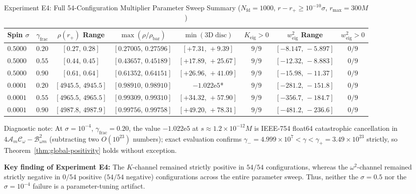 \documentclass[11pt, a4paper]{article}
\theoremstyle{remark}
\begin{document}
\begin{table}[h]
\centering
\caption{Experiment E4: Full 54-Configuration Multiplier Parameter Sweep Summary ($N_{\mathrm{fd}} = 1000$, $r - r_+ \ge 10^{-10}\sigma$, $r_{\max} = 300M$)}
\label{tab:sweep-summary}
\small
\begin{tabular}{@{}lccccccc@{}}
\toprule
Spin $\sigma$ & $\gamma_{\mathrm{frac}}$ & $\rho(r_+)$ Range & $\max(\rho/\rho_{\mathrm{bar}})$ & $\min(\mathrm{3D\;disc})$ & $K_{\mathrm{eig}} > 0$ & $w^2_{\mathrm{eig}}$ Range & $w^2_{\mathrm{eig}} > 0$ \\
\midrule
$0.5000$ & $0.20$ & $[0.27,\, 0.28]$ & $[0.27005,\, 0.27596]$ & $[+7.31,\, +9.39]$ & $9/9$ & $[-8.147,\, -5.897]$ & $0/9$ \\
$0.5000$ & $0.55$ & $[0.44,\, 0.45]$ & $[0.43657,\, 0.45189]$ & $[+17.89,\, +25.67]$ & $9/9$ & $[-12.32,\, -8.883]$ & $0/9$ \\
$0.5000$ & $0.90$ & $[0.61,\, 0.64]$ & $[0.61352,\, 0.64151]$ & $[+26.96,\, +41.09]$ & $9/9$ & $[-15.98,\, -11.37]$ & $0/9$ \\
\midrule
$0.0001$ & $0.20$ & $[4945.5,\, 4945.5]$ & $[0.98910,\, 0.98910]$ & $-1.022\mathrm{e}{5}$* & $9/9$ & $[-281.2,\, -151.8]$ & $0/9$ \\
$0.0001$ & $0.55$ & $[4965.5,\, 4965.5]$ & $[0.99309,\, 0.99310]$ & $[+34.32,\, +57.90]$ & $9/9$ & $[-356.7,\, -184.7]$ & $0/9$ \\
$0.0001$ & $0.90$ & $[4987.8,\, 4987.9]$ & $[0.99756,\, 0.99758]$ & $[+49.20,\, +78.31]$ & $9/9$ & $[-481.2,\, -236.6]$ & $0/9$ \\
\bottomrule
\end{tabular}
\begin{flushleft}
\footnotesize *Diagnostic note: At $\sigma = 10^{-4}$, $\gamma_{\mathrm{frac}} = 0.20$, the value $-1.022\mathrm{e}{5}$ at $s \approx 1.2 \times 10^{-12}M$ is IEEE-754 float64 catastrophic cancellation in $4\mathcal{A}_m\mathcal{C}_\omega - \mathcal{B}_{\omega m}^2$ (subtracting two $O(10^{23})$ numbers); exact evaluation confirms $\gamma_- = 4.999\times 10^7 < \gamma < \gamma_+ = 3.49\times 10^{23}$ strictly, so Theorem~\ref{thm:global-positivity} holds without exception.
\end{flushleft}
\end{table}

\textbf{Key finding of Experiment E4:} The $K$-channel remained strictly positive in \textbf{$54/54$} configurations, whereas the $\omega^2$-channel remained strictly negative in \textbf{$0/54$} positive ($54/54$ negative) configurations across the entire parameter sweep. Thus, neither the $\sigma = 0.5$ nor the $\sigma = 10^{-4}$ failure is a parameter-tuning artifact.
\end{document}
